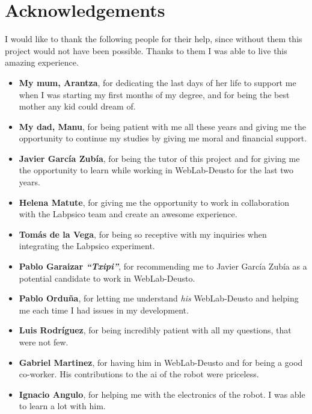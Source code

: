 \chapter*{Acknowledgements}

I would like to thank the following people for their help, since without them this project would not
have been possible. Thanks to them I was able to live this amazing experience.

\begin{itemize}
	\item \textbf{My mum, Arantza}, for dedicating the last days of her life to support me when I
	was starting my first months of my degree, and for being the best mother any kid could dream of.

	\item \textbf{My dad, Manu}, for being patient with me all these years and giving me the
	opportunity to continue my studies by giving me moral and financial support.

	\item \textbf{Javier García Zubía}, for being the tutor of this project and for giving me the
	opportunity to learn while working in WebLab-Deusto for the last two years.

	\item \textbf{Helena Matute}, for giving me the opportunity to work in collaboration with the
	Labpsico team and create an awesome experience.

	\item \textbf{Tomás de la Vega}, for being so receptive with my inquiries when integrating the
	Labpsico experiment.

	\item \textbf{Pablo Garaizar \emph{``Txipi''}}, for recommending me to Javier García Zubía as a
	potential candidate to work in WebLab-Deusto.

	\item \textbf{Pablo Orduña}, for letting me understand \emph{his} WebLab-Deusto and helping me
	each time I had issues in my development.

	\item \textbf{Luis Rodríguez}, for being incredibly patient with all my questions, that were not
	few.

	\item \textbf{Gabriel Martinez}, for having him in WebLab-Deusto and for being a good co-worker.
	His contributions to the \acrshort{ai} of the robot were priceless.

	\item \textbf{Ignacio Angulo}, for helping me with the electronics of the robot. I was able to
	learn a lot with him.
\end{itemize}


